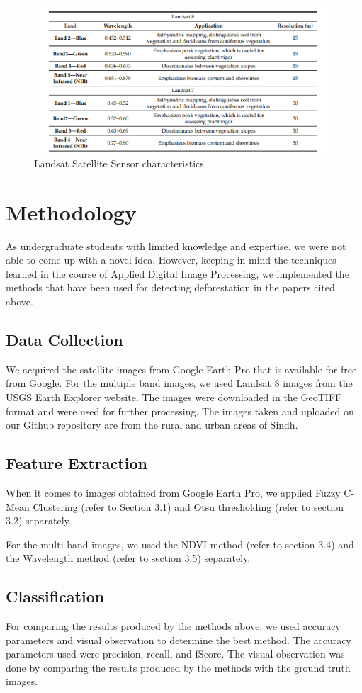 \documentclass[12pt,a4paper,IEEEtran]{article}
\begin{document}
\begin{figure}[h]
	\centering
	\includegraphics[width=0.7\linewidth]{./wavelength-9.png}
	\caption{Landsat Satellite Sensor characteristics}
	\label{fig:wavelength}
\end{figure}

\section{Methodology}
As undergraduate students with limited knowledge and expertise, we were not able to come up with a novel idea. However, keeping in mind the techniques learned in the course of Applied Digital Image Processing, we implemented the methods that have been used for detecting deforestation in the papers cited above.

\subsection[4.1]{Data Collection}
We acquired the satellite images from Google Earth Pro that is available for free from Google. For the multiple band images, we used Landsat 8 images from the USGS Earth Explorer website. The images were downloaded in the GeoTIFF format and were used for further processing. The images taken and uploaded on our Github repository are from the rural and urban areas of Sindh. 

\subsection[4.2]{Feature Extraction}
When it comes to images obtained from Google Earth Pro, we applied Fuzzy C-Mean Clustering (refer to Section 3.1) and Otsu thresholding (refer to section 3.2) separately. 

For the multi-band images, we used the NDVI method (refer to section 3.4) and the Wavelength method (refer to section 3.5) separately.

\subsection[4.3]{Classification}
For comparing the results produced by the methods above, we used accuracy parameters and visual observation to determine the best method. The accuracy parameters used were precision, recall, and fScore. The visual observation was done by comparing the results produced by the methods with the ground truth images.
\end{document}
